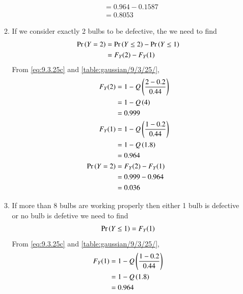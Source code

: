 \documentclass[journal,12pt,onecolumn]{IEEEtran}
\theoremstyle{remark}
\begin{document}
\begin{enumerate}[label=(\roman*)]
\begin{enumerate}[label=(\alph*)]
\begin{align}
		   &= 0.964 - 0.1587\\
		   &= 0.8053
\end{align}
\item If we consider exactly 2 bulbs to be defective, the we need to find 
\begin{align}
	\Pr\left(Y = 2\right) &= \Pr\left(Y \le 2\right) - \Pr\left(Y \le 1\right)\\
		   &= F_Y(2) - F_Y(1)
\end{align}
From \eqref{eq:9.3.25c} and \autoref{table:gaussian/9/3/25/},
\begin{align}
	F_Y(2)&=1 -Q\left( \frac{2-0.2}{0.44}\right) \\
	&= 1 - Q\left(4\right)\\
	&= 0.999\\
	F_Y(1)&=1 -Q\left( \frac{1-0.2}{0.44}\right) \\
	&= 1 - Q\left(1.8\right)\\
	&= 0.964\\
	\Pr\left(Y = 2\right) &= F_Y(2) - F_Y(1)\\
		   &= 0.999 - 0.964\\
		   &= 0.036
\end{align}
\item If more than 8 bulbs are working properly then either 1 bulb is defective or no bulb is defetive we need to find
\begin{align}
	\Pr\left(Y \le 1\right) = F_Y(1)
\end{align}
From \eqref{eq:9.3.25c} and \autoref{table:gaussian/9/3/25/},
\begin{align}
	F_Y(1)&=1 -Q\left( \frac{1-0.2}{0.44}\right) \\
	&= 1 - Q\left(1.8\right)\\
	&= 0.964
\end{align}


\end{enumerate}
\end{enumerate}
\end{document}
